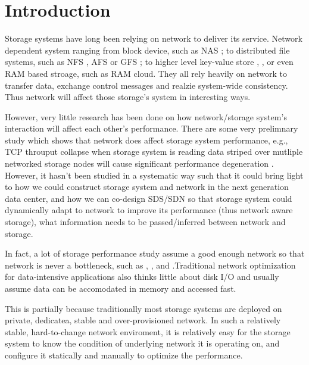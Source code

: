 \section{Introduction}
\label{section:intro}

Storage systems have long been relying on network to deliver its service. Network dependent system ranging from block device, such as NAS \cite{nas}; to distributed file systems, such as NFS \cite{nfs}, AFS \cite{afs} or GFS \cite{gfs}; to higher level key-value store \cite{dynamo}, \cite{big-table}, or even RAM based stroage, such as RAM cloud. They all rely heavily on network to transfer data, exchange control messages and realzie system-wide consistency. Thus network will affect those storage's system in interesting ways.

However, very little research has been done on how network/storage system's interaction will affect each other's performance. There are some very prelimnary study which shows that network does affect storage system performance, e.g., TCP throuput collapse when storage system is reading data striped over mutliple networked storage nodes will cause significant performance degeneration \cite{incast}.
 However, it hasn't been studied in a systematic way such that it could bring light to how we could construct storage system and network in the next generation data center, and how we can co-design SDS/SDN so that storage system could dynamically adapt to network to improve its performance (thus network aware storage), what information needs to be passed/inferred between network and storage. 


In fact, a lot of storage performance study assume a good enough network so that network is never a bottleneck, such as \cite{shedule-storage-system}, \cite{pisces}, and \cite{flat-datacenter-storage}.Traditional network optimization for data-intensive applications also thinks little about disk I/O and usually assume data can be accomodated in memory and accessed fast.

This is partially because traditionally most storage systems are deployed on private, dedicatea, stable and over-provisioned network.
 In such a relatively stable, hard-to-change network enviroment, it is relatively easy for the storage system to know the condition of underlying network it is operating on, and configure it statically and manually to optimize the performance.

